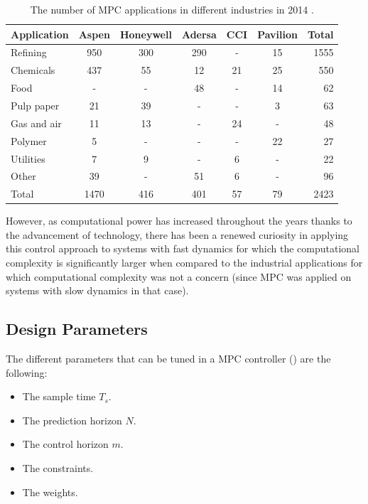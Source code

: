 \documentclass{thesisreport}
\begin{document}
\begin{table}[h]
\setlength{\tabcolsep}{15pt} %
\renewcommand{\arraystretch}{1} %
 \caption{The number of MPC applications in different industries in 2014 \cite{Kozak2014}.}
 \label{table_MPC}
\begin{tabular}{l c c c c c r}
Application & Aspen & Honeywell & Adersa & CCI & Pavilion & Total \\
\hline
Refining & 950 & 300 & 290 & - & 15 & 1555 \\
Chemicals & 437 & 55 & 12 & 21 & 25 & 550 \\
Food & - & - & 48 & - & 14 & 62 \\
Pulp paper & 21 & 39 & - & - & 3 & 63 \\
Gas and air & 11 & 13 & - & 24 & - & 48 \\
Polymer & 5 & - & - & - & 22 & 27 \\
Utilities & 7 & 9 & - & 6 & - & 22 \\
Other & 39 & - & 51 & 6 & - & 96 \\
\hline 
\hline
Total & 1470 & 416 & 401 & 57 & 79 & 2423 \\
\end{tabular}
\end{table}

\noindent However, as computational power has increased throughout the years thanks to the advancement of technology, there has been a renewed curiosity in applying this control approach to systems with fast dynamics for which the computational complexity is significantly larger when compared to the industrial applications for which computational complexity was not a concern (since MPC was applied on systems with slow dynamics in that case).
 
\subsection{Design Parameters}\label{design_parameters}
The different parameters that can be tuned in a MPC controller (\cite{MathWorks2018, MathWorks2018b, MathWorks2018c}) are the following:

\begin{itemize}
	\item The sample time $T_s$.
	\item The prediction horizon $N$.
	\item The control horizon $m$.
	\item The constraints.
	\item The weights.
\end{itemize}
\end{document}
